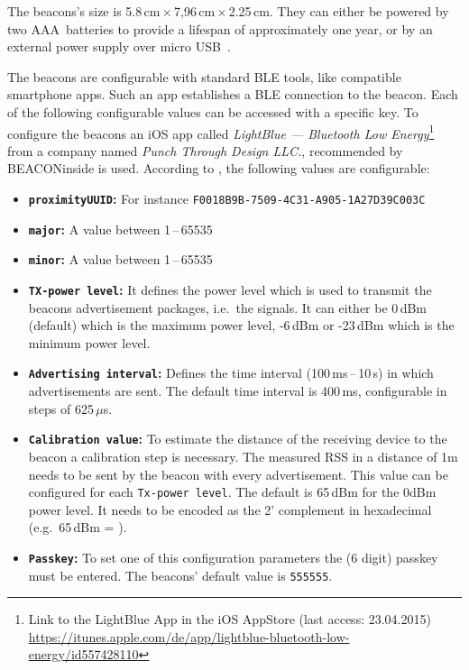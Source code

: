 The beacons's size is 5.8\,cm\,$\times$\,7,96\,cm\,$\times$\,2.25\,cm. They can either be powered by two AAA~batteries to provide a lifespan of approximately one year, or by an external power supply over micro USB~\citep{binside:ds}.

The beacons are configurable with standard \ac{BLE} tools, like compatible smartphone apps. Such an app establishes a \ac{BLE} connection to the beacon. Each of the following configurable values can be accessed with a specific key. To configure the beacons an iOS app called \emph{LightBlue --- Bluetooth Low Energy}\footnote{Link to the LightBlue App in the iOS AppStore (last access: 23.04.2015) \url{https://itunes.apple.com/de/app/lightblue-bluetooth-low-energy/id557428110}} from a company named \emph{Punch Through Design LLC.}, recommended by BEACONinside is used. According to \citet{binside:ds}, the following values are configurable:
\begin{itemize}
  \item \textbf{\texttt{proximityUUID}:} For instance \texttt{F0018B9B-7509-4C31-A905-1A27D39C003C}
  \item \textbf{\texttt{major}:} A value between 1\,--\,65535
  \item \textbf{\texttt{minor}:} A value between 1\,--\,65535
  \item \textbf{\texttt{\acs{TX}-power level}:} It defines the power level which is used to transmit the beacons advertisement packages, i.e.\ the signals. It can either be 0\,dBm (default) which is the maximum power level, -6\,dBm or -23\,dBm which is the minimum power level.
  \item \textbf{\texttt{Advertising interval}:} Defines the time interval (100\,ms\,--\,10\,s) in which advertisements are sent. The default time interval is 400\,ms, configurable in steps of 625\,$\mu$s.
  \item \textbf{\texttt{Calibration value}:} To estimate the distance of the receiving device to the beacon a calibration step is necessary. The measured \acs{RSS} in a distance of 1m needs to be sent by the beacon with every advertisement. This value can be configured for each \texttt{Tx-power level}. The default is 65\,dBm for the 0dBm power level. It needs to be encoded as the 2' complement in hexadecimal (e.g.\ 65\,dBm = ).
  \item \textbf{\texttt{Passkey}:} To set one of this configuration parameters the (6 digit) passkey must be entered. The beacons' default value is \texttt{555555}.
\end{itemize}

